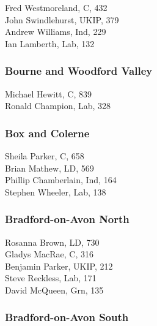 \documentclass[a4paper,openany,10pt]{book}
\begin{document}
Fred Westmoreland, C, 432\\
John Swindlehurst, UKIP, 379\\
Andrew Williams, Ind, 229\\
Ian Lamberth, Lab, 132\\


\subsubsection*{Bourne and Woodford Valley}



Michael Hewitt, C, 839\\
Ronald Champion, Lab, 328\\


\subsubsection*{Box and Colerne}



Sheila Parker, C, 658\\
Brian Mathew, LD, 569\\
Phillip Chamberlain, Ind, 164\\
Stephen Wheeler, Lab, 138\\


\subsubsection*{Bradford-on-Avon North}



Rosanna Brown, LD, 730\\
Gladys MacRae, C, 316\\
Benjamin Parker, UKIP, 212\\
Steve Reckless, Lab, 171\\
David McQueen, Grn, 135\\


\subsubsection*{Bradford-on-Avon South}

\end{document}
